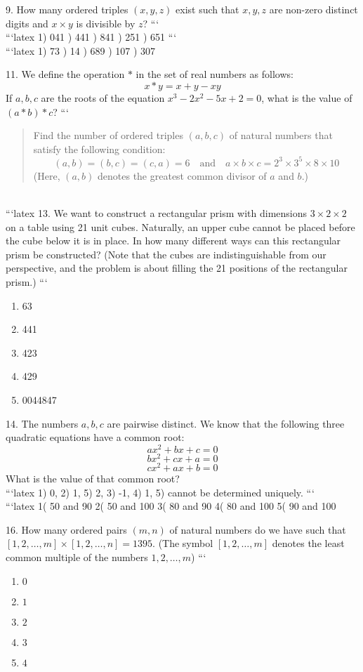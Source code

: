 9. How many ordered triples $(x, y, z)$ exist such that $x, y, z$ are non-zero distinct digits and $x \times y$ is divisible by $z$?
```
\\
```latex
1) 041 ) 441 ) 841 ) 251 ) 651
```
\\
```latex
1) 73 ) 14 ) 689 ) 107 ) 307

11. We define the operation $*$ in the set of real numbers as follows:
\[ x * y = x + y - xy \]
If $a, b, c$ are the roots of the equation $x^3 - 2x^2 - 5x + 2 = 0$, what is the value of $(a * b) * c$?
```
\\
\begin{quote}
Find the number of ordered triples $(a, b, c)$ of natural numbers that satisfy the following condition: 
\[
(a, b) = (b, c) = (c, a) = 6 \quad \text{and} \quad a \times b \times c = 2^3 \times 3^5 \times 8 \times 10
\]
(Here, $(a, b)$ denotes the greatest common divisor of $a$ and $b$.)
\end{quote}
\\
```latex
13. We want to construct a rectangular prism with dimensions $3 \times 2 \times 2$ on a table using 21 unit cubes. Naturally, an upper cube cannot be placed before the cube below it is in place. In how many different ways can this rectangular prism be constructed? (Note that the cubes are indistinguishable from our perspective, and the problem is about filling the 21 positions of the rectangular prism.)
```
\\
\begin{enumerate}
    \item 63
    \item 441
    \item 423
    \item 429
    \item 0044847
\end{enumerate}

14. The numbers $a, b, c$ are pairwise distinct. We know that the following three quadratic equations have a common root:
\[
ax^2 + bx + c = 0
\]
\[
bx^2 + cx + a = 0
\]
\[
cx^2 + ax + b = 0
\]
What is the value of that common root?
\\
```latex
1) 0, 2) 1, 5) 2, 3) -1, 4) 1, 5) cannot be determined uniquely.
```
\\
```latex
1( 50 and 90  2( 50 and 100  3( 80 and 90  4( 80 and 100  5( 90 and 100  

16. How many ordered pairs $(m, n)$ of natural numbers do we have such that $[1, 2, \ldots, m] \times [1, 2, \ldots, n] = 1395$.  
(The symbol $[1, 2, \ldots, m]$ denotes the least common multiple of the numbers $1, 2, \ldots, m$)
```
\\
\begin{enumerate}
    \item $0$
    \item $1$
    \item $2$
    \item $3$
    \item $4$
\end{enumerate}

